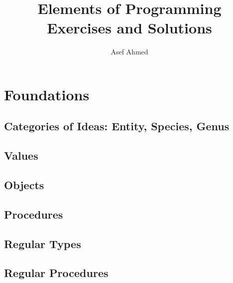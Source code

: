 





\title{Elements of Programming Exercises and Solutions}

\author{Asef Ahmed}



\maketitle

\section{Foundations}

\subsection{Categories of Ideas: Entity, Species, Genus}

\subsection{Values}

\subsection{Objects}

\subsection{Procedures}

\subsection{Regular Types}

\subsection{Regular Procedures}


    

